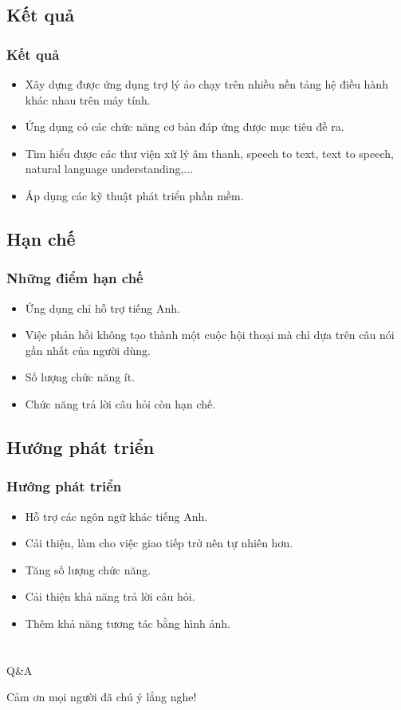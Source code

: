 \documentclass{beamer}
\begin{document}
\subsection{Kết quả}
\begin{frame}
\frametitle{Kết quả}
\begin{itemize}
\item Xây dựng được ứng dụng trợ lý ảo chạy trên nhiều nền tảng hệ điều hành khác nhau trên máy tính.
\item Ứng dụng có các chức năng cơ bản đáp ứng được mục tiêu đề ra.
\item Tìm hiểu được các thư viện xử lý âm thanh, speech to text, text to speech, natural language understanding,...
\item Áp dụng các kỹ thuật phát triển phần mềm.
\end{itemize}
\end{frame}

\subsection{Hạn chế}
\begin{frame}
\frametitle{Những điểm hạn chế}
\begin{itemize}
\item Ứng dụng chỉ hỗ trợ tiếng Anh.
\item Việc phản hồi không tạo thành một cuộc hội thoại mà chỉ dựa trên câu nói gần nhất của người dùng.
\item Số lượng chức năng ít.
\item Chức năng trả lời câu hỏi còn hạn chế.
\end{itemize}
\end{frame}

\subsection{Hướng phát triển}
\begin{frame}
\frametitle{Hướng phát triển}
\begin{itemize}
\item Hỗ trợ các ngôn ngữ khác tiếng Anh.
\item Cải thiện, làm cho việc giao tiếp trở nên tự nhiên hơn.
\item Tăng số lượng chức năng.
\item Cải thiện khả năng trả lời câu hỏi.
\item Thêm khả năng tương tác bằng hình ảnh.
\end{itemize}
\end{frame}

\section*{}

\begin{frame}
\Huge{\centerline{Q\&A}}
\end{frame}

\begin{frame}
\huge{\centerline{Cảm ơn mọi người đã chú ý lắng nghe!}}
\end{frame}
\end{document}
